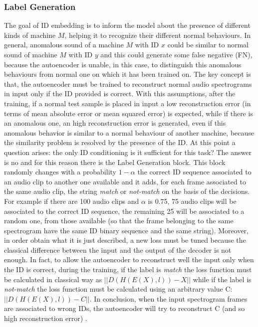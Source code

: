 \subsubsection{Label Generation}
The goal of ID embedding is to inform the model about the presence of different kinds of machine $M$, helping it to recognize their different normal behaviours. In general, anomalous sound of a machine $M$ with ID $x$ could be similar to normal sound of machine $M$ with ID $y$ and this could generate some false negative (FN), because the autoencoder is unable, in this case, to distinguish this anomalous behaviours from normal one on which it has been trained on. The key concept is that, the autoencoder must be trained to reconstruct normal audio spectrograms in input only if the ID provided is correct. With this assumptions, after the training, if a normal test sample is placed in input a low reconstruction error (in terms of mean absolute error or mean squared error) is expected, while if there is an anomalous one, an high  reconstruction error is generated, even if this anomalous behavior is similar to a normal behaviour of another machine, because the similarity problem is resolved by the presence of the ID. At this point a question arises: the only ID conditioning is it sufficient for this task? The answer is no and for this reason there is the Label Generation block. This block randomly changes with a probability $1-\alpha$ the correct ID sequence associated to an audio clip to another one available and it adds, for each frame associated to the same audio clip, the string \textit{match} or \textit{not-match} on the basis of the decisions. For example if there are 100 audio clips and $\alpha$ is 0.75, 75 audio clips will be associated to the correct ID sequence, the remaining 25 will be associated to a random one, from those available (so that the frame belonging to the same spectrogram have the same ID binary sequence and the same string). Moreover, in order obtain what it is just described, a new loss must be tuned because the classical difference between the input and the output of the decoder is not enough. In fact, to allow the autoencoder to reconstruct well the input only when the ID is correct, during the training, if the label is \textit{match} the loss function must be calculated in classical way as $||D(H(E(X),l)) - X||$
while if the label is \textit{not-match} the loss function must be calculated using an arbitrary value C: $||D(H(E(X),l)) - C||$.
In conclusion, when the input spectrogram frames are associated to wrong IDs, the autoencoder will try to reconstruct C (and so high reconstruction error) .

